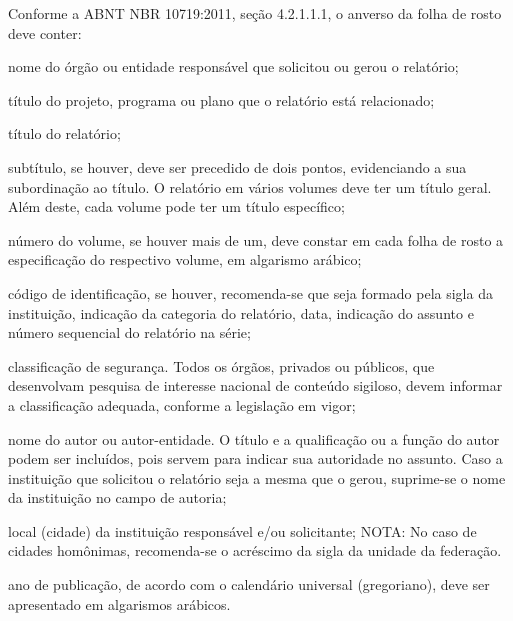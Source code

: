 \documentclass[12pt,openright,twoside,a4paper,english,french,spanish,brazil]{abntex2}
\begin{document}
\frenchspacing 


\imprimircapa

\imprimirfolhaderosto*


{
\ABNTEXchapterfont

\vspace*{\fill}

Conforme a ABNT NBR 10719:2011, seção 4.2.1.1.1, o anverso da folha de rosto
deve conter:

\begin{alineas}
  \item nome do órgão ou entidade responsável que solicitou ou gerou o
   relatório; 
  \item título do projeto, programa ou plano que o relatório está relacionado;
  \item título do relatório;
  \item subtítulo, se houver, deve ser precedido de dois pontos, evidenciando a
   sua subordinação ao título. O relatório em vários volumes deve ter um título
   geral. Além deste, cada volume pode ter um título específico; 
  \item número do volume, se houver mais de um, deve constar em cada folha de
   rosto a especificação do respectivo volume, em algarismo arábico; 
  \item código de identificação, se houver, recomenda-se que seja formado
   pela sigla da instituição, indicação da categoria do relatório, data,
   indicação do assunto e número sequencial do relatório na série; 
  \item classificação de segurança. Todos os órgãos, privados ou públicos, que
   desenvolvam pesquisa de interesse nacional de conteúdo sigiloso, devem
    informar a classificação adequada, conforme a legislação em vigor; 
  \item nome do autor ou autor-entidade. O título e a qualificação ou a função
   do autor podem ser incluídos, pois servem para indicar sua autoridade no
   assunto. Caso a instituição que solicitou o relatório seja a mesma que o
   gerou, suprime-se o nome da instituição no campo de autoria; 
  \item local (cidade) da instituição responsável e/ou solicitante; NOTA: No
   caso de cidades homônimas, recomenda-se o acréscimo da sigla da unidade da
   federação.
  \item ano de publicação, de acordo com o calendário universal (gregoriano),
  deve ser apresentado em algarismos arábicos.
\end{alineas}

\vspace*{\fill}
}
\end{document}
